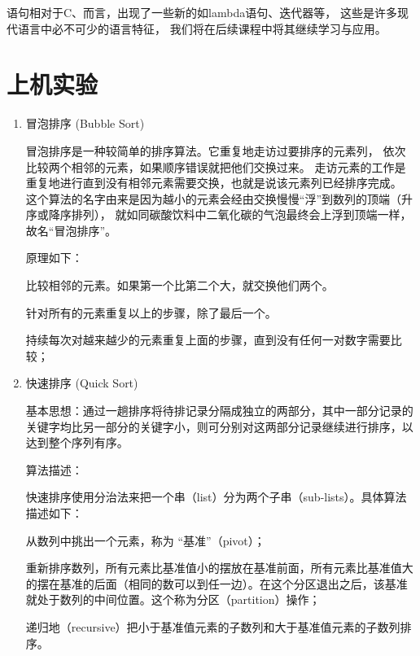 \cs 语句相对于C、\cpp 而言，出现了一些新的如lambda语句、迭代器等，
这些是许多现代语言中必不可少的语言特征，
我们将在后续课程中将其继续学习与应用。

\section{上机实验}
\begin{enumerate}
    \item 冒泡排序 (Bubble Sort)

          冒泡排序是一种较简单的排序算法。它重复地走访过要排序的元素列，
          依次比较两个相邻的元素，如果顺序错误就把他们交换过来。
          走访元素的工作是重复地进行直到没有相邻元素需要交换，也就是说该元素列已经排序完成。
          这个算法的名字由来是因为越小的元素会经由交换慢慢“浮”到数列的顶端（升序或降序排列），
          就如同碳酸饮料中二氧化碳的气泡最终会上浮到顶端一样，故名“冒泡排序”。

          原理如下：

          比较相邻的元素。如果第一个比第二个大，就交换他们两个。

          针对所有的元素重复以上的步骤，除了最后一个。

          持续每次对越来越少的元素重复上面的步骤，直到没有任何一对数字需要比较；

    \item 快速排序 (Quick Sort)

          基本思想：通过一趟排序将待排记录分隔成独立的两部分，其中一部分记录的关键字均比另一部分的关键字小，则可分别对这两部分记录继续进行排序，以达到整个序列有序。

          算法描述：

          快速排序使用分治法来把一个串（list）分为两个子串（sub-lists）。具体算法描述如下：

          从数列中挑出一个元素，称为 “基准”（pivot）；

          重新排序数列，所有元素比基准值小的摆放在基准前面，所有元素比基准值大的摆在基准的后面（相同的数可以到任一边）。在这个分区退出之后，该基准就处于数列的中间位置。这个称为分区（partition）操作；

          递归地（recursive）把小于基准值元素的子数列和大于基准值元素的子数列排序。

\end{enumerate}
